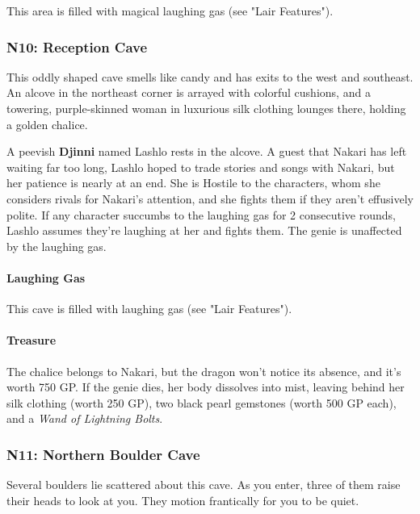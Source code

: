 \documentclass[letterpaper, 11pt, twocolumn]{dndbook}
\begin{document}
This area is filled with magical laughing gas (see "Lair Features").

\subsubsection{N10: Reception Cave}

\begin{DndReadAloud}
This oddly shaped cave smells like candy and has exits to the west and southeast. An alcove in the northeast corner is arrayed with colorful cushions, and a towering, purple-skinned woman in luxurious silk clothing lounges there, holding a golden chalice.
\end{DndReadAloud}

A peevish \textbf{Djinni} named Lashlo rests in the alcove. A guest that Nakari has left waiting far too long, Lashlo hoped to trade stories and songs with Nakari, but her patience is nearly at an end. She is Hostile to the characters, whom she considers rivals for Nakari's attention, and she fights them if they aren't effusively polite. If any character succumbs to the laughing gas for 2 consecutive rounds, Lashlo assumes they're laughing at her and fights them. The genie is unaffected by the laughing gas.

\paragraph{Laughing Gas}

This cave is filled with laughing gas (see "Lair Features").

\paragraph{Treasure}

The chalice belongs to Nakari, but the dragon won't notice its absence, and it's worth 750 GP. If the genie dies, her body dissolves into mist, leaving behind her silk clothing (worth 250 GP), two black pearl gemstones (worth 500 GP each), and a \textit{Wand of Lightning Bolts}.

\subsubsection{N11: Northern Boulder Cave}

\begin{DndReadAloud}
Several boulders lie scattered about this cave. As you enter, three of them raise their heads to look at you. They motion frantically for you to be quiet.
\end{DndReadAloud}
\end{document}
